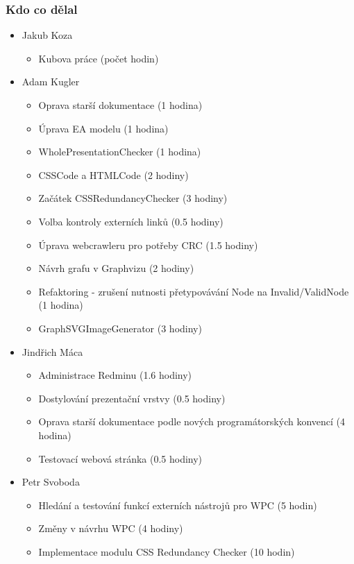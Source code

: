 \documentclass{beamer}
\begin{document}
\begin{frame}[allowframebreaks]\frametitle{Kdo co dělal} 
  \begin{itemize}
    \item Jakub Koza
      \begin{itemize}
       \item Kubova práce (počet hodin)
     \end{itemize}

    \item Adam Kugler
      \begin{itemize}
       \item Oprava starší dokumentace (1 hodina)
			 \item Úprava EA modelu (1 hodina)
       \item WholePresentationChecker (1 hodina)
			 \item CSSCode a HTMLCode (2 hodiny)
       \item Začátek CSSRedundancyChecker (3 hodiny)
       \item Volba kontroly externích linků (0.5 hodiny)
			 \item Úprava webcrawleru pro potřeby CRC (1.5 hodiny)
			 \item Návrh grafu v Graphvizu (2 hodiny)
       \item Refaktoring - zrušení nutnosti přetypovávání Node na Invalid/ValidNode (1 hodina)
			 \item GraphSVGImageGenerator (3 hodiny)
     \end{itemize}

    \item Jindřich Máca
      \begin{itemize}
       \item Administrace Redminu (1.6 hodiny)
			 \item Dostylování prezentační vrstvy (0.5 hodiny)
			 \item Oprava starší dokumentace podle nových programátorských konvencí (4 hodina)
			 \item Testovací webová stránka (0.5 hodiny)
     \end{itemize}

    \item Petr Svoboda
      \begin{itemize}
       \item Hledání a testování funkcí externích nástrojů pro WPC (5 hodin)
       \item Změny v návrhu WPC (4 hodiny)
       \item Implementace modulu CSS Redundancy Checker (10 hodin)
     \end{itemize}
   \end{itemize}  
\end{frame} 
\end{document}

